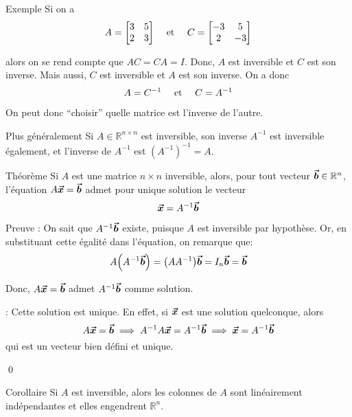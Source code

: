 \documentclass[a4paper]{article}
\begin{document}
\begin{parag}{Exemple}
    Si on a
    \[A = \begin{bmatrix} 3 & 5 \\ 2 & 3 \end{bmatrix} \mathspace \text{ et } \mathspace C = \begin{bmatrix} -3 & 5 \\ 2 & -3 \end{bmatrix} \]

    alors on se rend compte que $AC = CA = I$. Donc, $A$ est inversible et $C$ est son inverse. Mais aussi, $C$ est inversible et $A$ est son inverse. On a donc
    \[A = C^{-1} \quad \text{ et } \quad C = A^{-1}\]

    On peut donc ``choisir'' quelle matrice est l'inverse de l'autre.

    \begin{subparag}{Plus généralement}
        Si $A \in \mathbb{R}^{n \times n}$ est inversible, son inverse $A^{-1}$ est inversible également, et l'inverse de $A^{-1}$ est $\left(A^{-1}\right)^{-1} = A$.
    \end{subparag}

\end{parag}

\begin{parag}{Théorème}
    Si $A$ est une matrice $n \times n$ inversible, alors, pour tout vecteur $\bm{\protect\vec{b}} \in \mathbb{R}^{n}$, l'équation $A \bm{\protect\vec{x}} = \bm{\protect\vec{b}}$ admet pour unique solution le vecteur
    \[\bm{\protect\vec{x}} = A^{-1} \bm{\protect\vec{b}}\]

    \begin{subparag}{Preuve}
        : On sait que $A^{-1} \bm{\protect\vec{b}}$ existe, puisque $A$ est inversible par hypothèse. Or, en substituant cette égalité dans l'équation, on remarque que:
        \[A\left(A^{-1}\bvec{b}\right) = \left(A A^{-1}\right)\bvec{b} = I_n\bvec{b} = \bvec{b}\]

        Donc, $A \bm{\protect\vec{x}} = \bm{\protect\vec{b}}$ admet $A^{-1} \bm{\protect\vec{b}}$ comme solution.

        \vspace{1em}
        : Cette solution est unique. En effet, si $\bm{\protect\vec{x}}$ est une solution quelconque, alors
        \[A \bm{\protect\vec{x}} = \bm{\protect\vec{b}} \implies A^{-1} A \bm{\protect\vec{x}} = A^{-1} \bm{\protect\vec{b}} \implies \bm{\protect\vec{x}} = A^{-1} \bm{\protect\vec{b}}\]
        qui est un vecteur bien défini et unique.

        \qed
    \end{subparag}

    \begin{subparag}{Corollaire}
        Si $A$ est inversible, alors les colonnes de $A$ sont linéairement indépendantes et elles engendrent $\mathbb{R}^{n}$.
    \end{subparag}


\end{parag}
\end{document}
